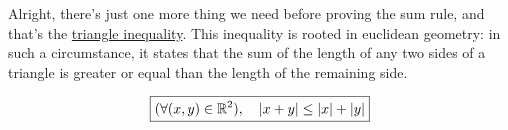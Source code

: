 \documentclass[solutions.tex]{subfiles}
\begin{document}
Alright, there's just one more thing we need before proving
the sum rule, and that's the
\href{https://en.wikipedia.org/wiki/Triangle\_inequality}
{triangle inequality}. This inequality is rooted in euclidean geometry:
in such a circumstance, it states that the sum of the length of any two
sides of a triangle is greater or equal than the length of the remaining
side.

\begin{theorem}
\begin{equation*} \begin{aligned}
	\boxed{(\forall (x,y)\in\mathbb{R}^2),\quad \lvert x+y \rvert\le \lvert x \rvert+\lvert y \rvert}
\end{aligned} \end{equation*}
\end{theorem}
\end{document}
